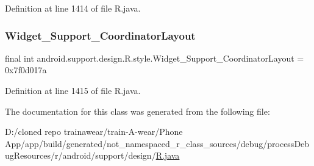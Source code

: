 Definition at line 1414 of file R.\+java.

\mbox{\label{classandroid_1_1support_1_1design_1_1_r_1_1style_a23cf73966d8f8c806022639b928ea871}} 
\subsubsection{\texorpdfstring{Widget\_Support\_CoordinatorLayout}{Widget\_Support\_CoordinatorLayout}}
{\footnotesize\ttfamily final int android.\+support.\+design.\+R.\+style.\+Widget\+\_\+\+Support\+\_\+\+Coordinator\+Layout = 0x7f0d017a\hspace{0.3cm}{\ttfamily [static]}}



Definition at line 1415 of file R.\+java.



The documentation for this class was generated from the following file\+:\begin{DoxyCompactItemize}
\item 
D\+:/cloned repo trainawear/train-\/\+A-\/wear/\+Phone App/app/build/generated/not\+\_\+namespaced\+\_\+r\+\_\+class\+\_\+sources/debug/process\+Debug\+Resources/r/android/support/design/\mbox{\hyperlink{process_debug_resources_2r_2android_2support_2design_2_r_8java}{R.\+java}}\end{DoxyCompactItemize}
